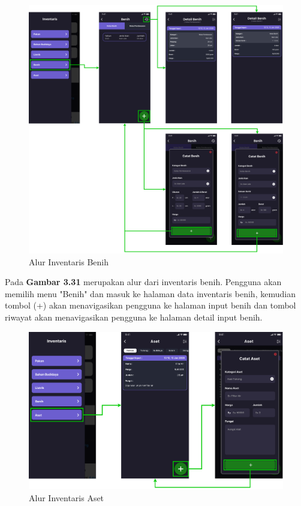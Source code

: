 \begin{enumerate}
\begin{enumerate}
		\begin{figure}[H]
			\centering
			\includegraphics[width=1\textwidth]{gambar/sprint2/flow_seed.png}
			\caption{Alur Inventaris Benih}
		\end{figure}

		Pada \textbf{Gambar 3.31} merupakan alur dari inventaris benih. Pengguna akan memilih menu "Benih" dan masuk ke halaman data inventaris benih, kemudian tombol (+) akan menavigasikan pengguna ke halaman input benih dan tombol riwayat akan menavigasikan pengguna ke halaman detail input benih.

		\begin{figure}[H]
			\centering
			\includegraphics[width=1\textwidth]{gambar/sprint2/flow_asset.png}
			\caption{Alur Inventaris Aset}
		\end{figure}


\end{enumerate}
\end{enumerate}
